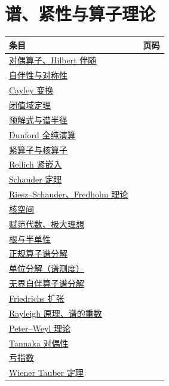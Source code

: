 \section*{谱、紧性与算子理论}
\begin{longtable}{p{0.80\linewidth}r}
\toprule 条目 & 页码\\\midrule\endhead
\hyperref[sec:yosida-07-01]{对偶算子、Hilbert 伴随} & \pageref{sec:yosida-07-01}\\
\hyperref[sec:yosida-07-03]{自伴性与对称性} & \pageref{sec:yosida-07-03}\\
\hyperref[sec:yosida-07-04]{Cayley 变换} & \pageref{sec:yosida-07-04}\\
\hyperref[sec:yosida-07-05]{闭值域定理} & \pageref{sec:yosida-07-05}\\
\hyperref[sec:yosida-08-02]{预解式与谱半径} & \pageref{sec:yosida-08-02}\\
\hyperref[sec:yosida-08-07]{Dunford 全纯演算} & \pageref{sec:yosida-08-07}\\
\hyperref[sec:yosida-10-02]{紧算子与核算子} & \pageref{sec:yosida-10-02}\\
\hyperref[sec:yosida-10-03]{Rellich 紧嵌入} & \pageref{sec:yosida-10-03}\\
\hyperref[sec:yosida-10-04]{Schauder 定理} & \pageref{sec:yosida-10-04}\\
\hyperref[sec:yosida-10-05]{Riesz--Schauder、Fredholm 理论} & \pageref{sec:yosida-10-05}\\
\hyperref[def:y10-nuclear-space]{核空间} & \pageref{def:y10-nuclear-space}\\
\hyperref[sec:yosida-11-01]{赋范代数、极大理想} & \pageref{sec:yosida-11-01}\\
\hyperref[sec:yosida-11-02]{根与半单性} & \pageref{sec:yosida-11-02}\\
\hyperref[sec:yosida-11-03]{正规算子谱分解} & \pageref{sec:yosida-11-03}\\
\hyperref[sec:yosida-11-05]{单位分解（谱测度）} & \pageref{sec:yosida-11-05}\\
\hyperref[sec:yosida-11-06]{无界自伴算子谱分解} & \pageref{sec:yosida-11-06}\\
\hyperref[sec:yosida-11-07]{Friedrichs 扩张} & \pageref{sec:yosida-11-07}\\
\hyperref[sec:yosida-11-08]{Rayleigh 原理、谱的重数} & \pageref{sec:yosida-11-08}\\
\hyperref[sec:yosida-11-10]{Peter--Weyl 理论} & \pageref{sec:yosida-11-10}\\
\hyperref[sec:yosida-11-11]{Tannaka 对偶性} & \pageref{sec:yosida-11-11}\\
\hyperref[sec:yosida-11-15]{亏指数} & \pageref{sec:yosida-11-15}\\
\hyperref[sec:yosida-11-16]{Wiener Tauber 定理} & \pageref{sec:yosida-11-16}\\
\bottomrule
\end{longtable}

